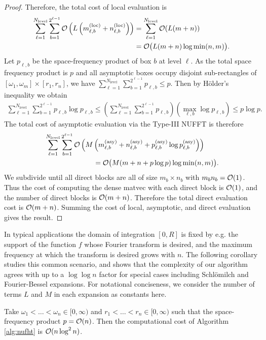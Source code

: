 \begin{proof}
    Therefore, the total cost of local evaluation is 
    \begin{align}
        \sum_{\ell=1}^{N_{\text{level}}} \sum_{b=1}^{2^{\ell-1}} \mathcal{O}\left(L\left(m_{\ell,b}^{(\text{loc})} + n_{\ell,b}^{(\text{loc})}\right)\right)
        &= \sum_{\ell=1}^{N_{\text{level}}} \mathcal{O}(L(m + n)) \\
        &= \mathcal{O}\big(L (m + n) \log \min(n,m)\big).
    \end{align}
    Let $p_{\ell,b}$ be the space-frequency product of box $b$ at level $\ell$.
    As the total space frequency product is $p$ and all asymptotic boxes occupy
    disjoint sub-rectangles of $[\omega_1, \omega_m] \times [r_1, r_n]$, we have
    $\sum_{\ell=1}^{N_{\text{level}}} \sum_{b=1}^{2^{\ell-1}} p_{\ell,b} \leq
    p$. Then by H\"older's inequality we obtain 
    \begin{align} 
        \sum_{\ell=1}^{N_{\text{level}}} \sum_{b=1}^{2^{\ell-1}} p_{\ell,b} \log p_{\ell,b}
        \leq \left( \sum_{\ell=1}^{N_{\text{level}}} \sum_{b=1}^{2^{\ell-1}} p_{\ell,b} \right) \left(\max_{\ell,b} \log p_{\ell,b} \right) 
        \leq p \log p.
    \end{align}
    The total cost of asymptotic evaluation via the Type-III NUFFT is therefore
    \begin{align}
        & \sum_{\ell=1}^{N_{\text{level}}} \sum_{b=1}^{2^{\ell-1}} \bO\left(M\left(m_{\ell,b}^{(\text{asy})} + n_{\ell,b}^{(\text{asy})} + p_{\ell,b}^{(\text{asy})} \log p_{\ell,b}^{(\text{asy})} \right)\right) \\
        &\hspace*{0.2\textwidth} = \bO\big(M (m + n + p\log p) \log \min(n,m) \big).
    \end{align}
    We subdivide until all direct blocks are all of size $m_b \times n_b$ with
    $m_bn_b = \mathcal{O}(1)$. Thus the cost of computing the dense matvec with each
    direct block is $\mathcal{O}(1)$, and the number of direct blocks is $\mathcal{O}(m + n)$.
    Therefore the total direct evaluation cost is $\mathcal{O}(m + n)$. Summing the cost
    of local, asymptotic, and direct evaluation gives the result.
\end{proof}

In typical applications the domain of integration $[0,R]$ is fixed by e.g. the
support of the function $f$ whose Fourier transform is desired, and the maximum
frequency at which the transform is desired grows with $n$. The following
corollary studies this common scenario, and shows that the complexity of our
algorithm agrees with \cite{townsend2015fast} up to a $\log\log n$ factor for
special cases including Schl\"omilch and Fourier-Bessel expansions. For
notational conciseness, we consider the number of terms $L$ and $M$ in each
expansion as constants here.
\begin{corollary}
    Take $\omega_1 < \dots < \omega_n \in [0,\infty)$ and $r_1 < \dots < r_n \in
    [0,\infty)$ such that the space-frequency product $p = \mathcal{O}(n)$. Then the
    computational cost of Algorithm \ref{alg:nufht} is $\mathcal{O}(n\log^2n)$.
\end{corollary}

